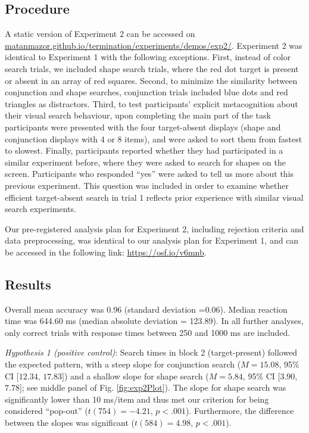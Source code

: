 \documentclass[
  english,
  man]{apa6}
\begin{document}
\hypertarget{procedure-1}{%
\subsection{Procedure}\label{procedure-1}}

A static version of Experiment 2 can be accessed on \href{matanmazor.github.io/termination/experiments/demos/exp1/}{matanmazor.github.io/termination/experiments/demos/exp2/}. Experiment 2 was identical to Experiment 1 with the following exceptions. First, instead of color search trials, we included shape search trials, where the red dot target is present or absent in an array of red squares. Second, to minimize the similarity between conjunction and shape searches, conjunction trials included blue dots and red triangles as distractors. Third, to test participants' explicit metacognition about their visual search behaviour, upon completing the main part of the task participants were presented with the four target-absent displays (shape and conjunction displays with 4 or 8 items), and were asked to sort them from fastest to slowest. Finally, participants reported whether they had participated in a similar experiment before, where they were asked to search for shapes on the screen. Participants who responded \enquote{yes} were asked to tell us more about this previous experiment. This question was included in order to examine whether efficient target-absent search in trial 1 reflects prior experience with similar visual search experiments.

Our pre-registered analysis plan for Experiment 2, including rejection criteria and data preprocessing, was identical to our analysis plan for Experiment 1, and can be accessed in the following link: \url{https://osf.io/v6mnb}.

\hypertarget{results-1}{%
\subsection{Results}\label{results-1}}

Overall mean accuracy was 0.96 (standard deviation =0.06). Median reaction time was 644.60 ms (median absolute deviation = 123.89). In all further analyses, only correct trials with response times between 250 and 1000 ms are included.

\emph{Hypothesis 1 (positive control)}: Search times in block 2 (target-present) followed the expected pattern, with a steep slope for conjunction search (\(M = 15.08\), 95\% CI \([12.34\), \(17.83]\)) and a shallow slope for shape search (\(M = 5.84\), 95\% CI \([3.90\), \(7.78]\); see middle panel of Fig. \ref{fig:exp2Plot}). The slope for shape search was significantly lower than 10 ms/item and thus met our criterion for being considered \enquote{pop-out} (\(t(754) = -4.21\), \(p < .001\)). Furthermore, the difference between the slopes was significant (\(t(584) = 4.98\), \(p < .001\)).
\end{document}
